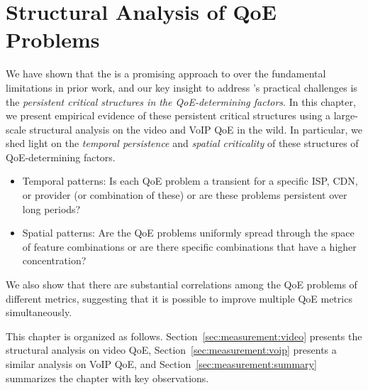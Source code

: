 \chapter{Structural Analysis of QoE Problems}
\label{ch:measurement}


We have shown that the \ddn is a promising approach to over the fundamental 
limitations in prior work, and our key insight to address \ddn's practical challenges
is the {\em persistent critical structures in the QoE-determining factors}.
In this chapter, we present empirical evidence of these persistent critical
structures using a large-scale structural analysis on the video and VoIP QoE in the wild.
In particular, we shed light on the {\em temporal persistence} and {\em spatial criticality}
of these structures of QoE-determining factors.
\begin{itemize}

\item {Temporal patterns:} 
Is each QoE problem a transient for 
a specific ISP, CDN, or provider (or combination of these) or are 
these problems persistent over long periods?

\item {Spatial patterns:} 
Are the QoE problems uniformly spread through the 
space of feature combinations or are there specific 
combinations that have a higher concentration?

\end{itemize}
We also show that there are substantial correlations
among the QoE problems of different metrics, suggesting that
it is possible to improve multiple QoE metrics simultaneously.

This chapter is organized as follows. 
Section~\ref{sec:measurement:video} presents the structural analysis
on video QoE,
Section~\ref{sec:measurement:voip} presents a similar analysis on 
VoIP QoE, and Section~\ref{sec:measurement:summary} summarizes
the chapter with key observations.


